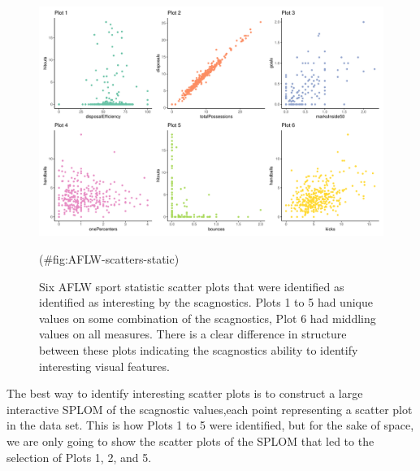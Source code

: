 \begin{Schunk}
\begin{figure}

{\centering \includegraphics[width=1\linewidth]{mason-lee-laa-cook_files/figure-latex/AFLW-scatters-static-1} 

}

\caption[Six AFLW sport statistic scatter plots that were identified as identified as interesting by the scagnostics]{Six AFLW sport statistic scatter plots that were identified as identified as interesting by the scagnostics. Plots 1 to 5 had unique values on some combination of the scagnostics, Plot 6 had middling values on all measures. There is a clear difference in structure between these plots indicating the scagnostics ability to identify interesting visual features.}(\#fig:AFLW-scatters-static)
\end{figure}
\end{Schunk}

The best way to identify interesting scatter plots is to construct a
large interactive SPLOM of the scagnostic values,each point representing
a scatter plot in the data set. This is how Plots 1 to 5 were
identified, but for the sake of space, we are only going to show the
scatter plots of the SPLOM that led to the selection of Plots 1, 2, and
5.

